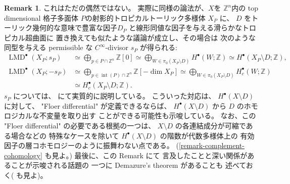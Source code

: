 \documentclass[a4paper,dvipdfmx,reqno,12pt]{amsart}
\theoremstyle{definition}
\newtheorem{remark}[theorem]{Remark}
\newcommand{\opn}[1]{\operatorname{#1}}
\numberwithin{equation}{section}
\begin{document}
\begin{remark}
これはただの偶然ではない。
実際に同様の論法が、$X$を
$\mathbb{Z}^{n}$内の top dimensional 格子多面体
$P$の射影的トロピカルトーリック多様体 $X_P$ に、
$D$ をトーリック幾何的な意味で豊富な因子$D_P$
と線形同値な因子を与える滑らかなトロピカル超曲面に
置き換えても似たような議論が成立し、その場合は
次のような同型を与える permissible な 
$C^{\infty}$-divisor 
$s_{P}$ が得られる:
\begin{align}
\opn{LMD}^{\bullet}(X_P;s_{P})
&\simeq \bigoplus_{p\in P\cap \mathbb{Z}^{n}}\mathbb{Z}[0]
\simeq \bigoplus_{W\in \pi_0(X_P\setminus D)}
H^{\bullet}(W;\mathbb{Z})\simeq 
H^{\bullet}(X_P\setminus D;\mathbb{Z}), \\
\opn{LMD}^{\bullet}(X_P;-s_{P})
&\simeq \bigoplus_{p\in \opn{int}(P)\cap \mathbb{Z}^{n}}
\mathbb{Z}[-\dim X_P]
\simeq \bigoplus_{W\in \pi_0(X_P\setminus D)}
H^{\bullet}_c(W;\mathbb{Z}) \\
&\simeq H^{\bullet}_c(X_P\setminus D;\mathbb{Z}).
\end{align}
$s_P$ については、\cite[Appendix D]{tsutsui2023graded}
にて実質的に説明している。
こういった対応は、
$H^{\bullet}(X\setminus D)$ に対して、
"Floer differential" が定義できるならば、
$H^{\bullet}(X\setminus D)$ から
$D$ のホモロジカルな不変量を取り出す
ことができる可能性も示唆している。
なお、この "Floer differential" の必要である根拠の一つは、
$X\setminus D$ の各連結成分が可縮である場合などの
特殊なケースを除いて $H^{\bullet}(X\setminus D)$
の階数が代数多様体上の
有効因子の層コホモロジーのように振舞わない点である。
(\cref{remark-complement-cohomology} も見よ。)
最後に、この Remark にて
言及したことと深い関係があることが示唆される話題の
一つに
Demazure's theorem \cite{MR284446} があることも
述べておく(\cite[]{MR2810322} も見よ)。
\end{remark}
\end{document}
